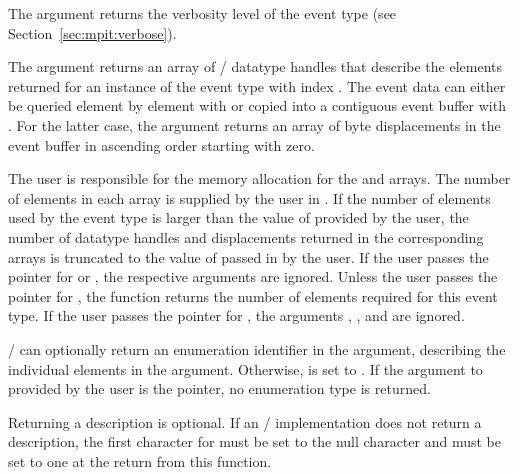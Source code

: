 The argument  returns the verbosity level of the event
type (see Section~\ref{sec:mpit:verbose}).

The argument  returns an array of \MPI/
datatype handles that describe the elements returned for an instance
of the event type with index .
The event data can either be queried element by element with 
 or copied
into a contiguous event buffer with . 
For the latter case, the 
argument  returns an 
array of byte displacements in the event buffer in ascending order starting with zero.

The user is responsible
for the memory allocation for the  and
 arrays. The number of elements
in each array is supplied by the user in .
If the number of elements used by the event type is larger
than the value of  provided by the user, the number
of datatype handles and displacements returned in the corresponding arrays
is truncated to the value of  passed in by the user.
If the user passes the  pointer for  
or , the respective arguments are ignored.
Unless the user passes the  pointer for , 
the function returns the number of elements required for this event type. 
If the user passes the  pointer for , 
the arguments ,
, and  are
ignored.


\MPI/ can optionally return an enumeration identifier in the
 argument, describing the individual elements in the
 argument. Otherwise,  is set
to . If the argument to 
provided by the user is the  pointer, no enumeration
type is returned.


 Returning a
description is optional.  If an \mpi/ implementation does not return a
description, the first character for  must be set to the null
character and  must be set to one at the return from this
function.

